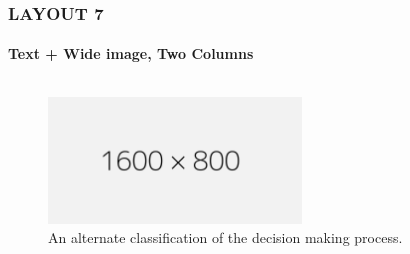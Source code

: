 \documentclass[14 pt]{beamer}
\begin{document}
\begin{frame}[t]
\frametitle{LAYOUT 7}
\framesubtitle{Text + Wide image, Two Columns}

\begin{columns}[t]
\begin{column}{0.45\textwidth}
\lipsum[8][1-4]
\end{column}

\begin{column}{0.45\textwidth}
\lipsum[9][1-4]
\end{column}
\end{columns}
\vskip1.5cm%
\begin{figure}[t]
\includegraphics[width=0.6\textwidth]{img/1600x800.png}
\caption{An alternate classification of the decision making process.}
\end{figure}

\end{frame}

\end{document}
